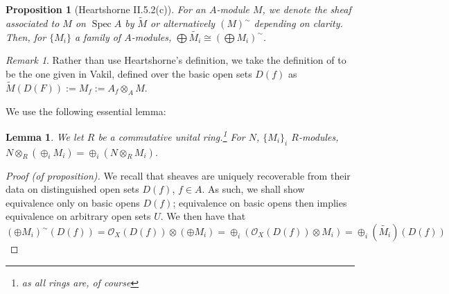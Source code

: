 \documentclass[english]{article}
\DeclareMathOperator{\spec}{Spec}
\newcommand{\OO}{\mathcal{O}}
\newcommand{\prob}[1]{\setcounter{section}{#1-1}\section{}}
\newtheorem*{lemma*}{Lemma}
\newtheorem*{proposition*}{Proposition}
\theoremstyle{remark}
\newtheorem*{remark*}{Remark}
\theoremstyle{definition}
\begin{document}
\prob{7}\begin{proposition*}[Heartshorne II.5.2(c)]
	For an $A$-module $M$, we denote the sheaf associated to $M$ on $\spec A$ by $\tilde{M}$ or alternatively $(M)^\sim$ depending on clarity. Then, for $\{M_i\}$ a family of $A$-modules, $\bigoplus \tilde{M_i}\cong(\bigoplus M_i)^\sim$.
\end{proposition*}
\begin{remark*}
 Rather than use Heartshorne's definition, we take the definition of  to be the one given in Vakil, defined over the basic open sets $D(f)$ as $\tilde{M}(D(F)):=M_f:=A_f\otimes_A M$.
\end{remark*}
We use the following essential lemma:
\begin{lemma*}
	We let $R$ be a commutative unital ring.\footnote{as all rings are, of course} For $N$, $\{M_i\}_i$ $R$-modules, $N\otimes_R\left(\oplus_i M_i\right)=\oplus_i(N\otimes_RM_i)$. 
\end{lemma*}

\begin{proof}[Proof (of proposition)]
We recall that sheaves are uniquely recoverable from their data on distinguished open sets $D(f)$, $f\in A$. As such, we shall show equivalence only on basic opens $D(f)$; equivalence on basic opens then implies equivalence on arbitrary open sets $U$. We then have that $(\oplus M_i)^\sim(D(f))=\OO_X(D(f))\otimes (\oplus M_i)=\oplus_i\left(\OO_X(D(f))\otimes M_i\right)=\oplus_i(\tilde{M_i})(D(f))$


\end{proof}
\end{document}
